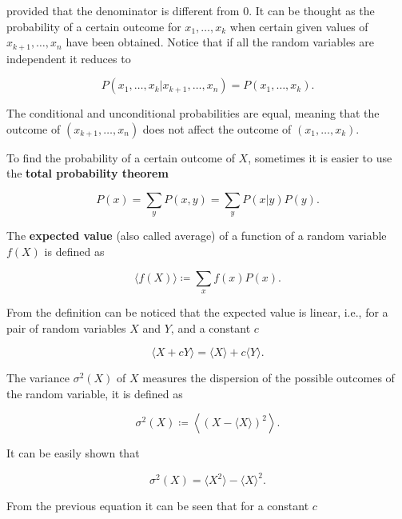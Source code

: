 provided that the denominator is different from $0$. It can be thought as the probability of a certain outcome for $x_1,\dotsc,x_k$ when certain given values of $x_{k+1},\dotsc,x_n$ have been obtained. Notice that if all the random variables are independent it reduces to

\begin{equation*}
  P(x_1,\dotsc,x_k|x_{k+1},\dotsc,x_n) = P(x_1,\dotsc,x_k).
\end{equation*}

The conditional and unconditional probabilities are equal, meaning that the outcome of $(x_{k+1},\dotsc,x_n)$ does not affect the outcome of $(x_1,\dotsc,x_k)$.

To find the probability of a certain outcome of $X$, sometimes it is easier to use the \textbf{total probability theorem}

\begin{equation*}
  P(x) = \sum_y P(x,y) = \sum_y P(x|y)P(y).
\end{equation*}

The \textbf{expected value} (also called average) of a function of a random variable $f(X)$ is defined as

\begin{equation}
  \label{eq:con-ave_def}
  \langle f(X)\rangle \coloneqq \sum_xf(x)P(x).
\end{equation}

From the definition can be noticed that the expected value is linear, i.e., for a pair of random variables $X$ and $Y$, and a constant $c$

\begin{equation*}
  \langle X+cY\rangle = \langle X\rangle+c\langle Y\rangle.
\end{equation*}

The variance $\sigma^2(X)$ of $X$ measures the dispersion of the possible outcomes of the random variable, it is defined as

\begin{equation*}
  \sigma^2(X) \coloneqq \left\langle\left( X-\langle X\rangle\right)^2\right\rangle.
\end{equation*}

It can be easily shown that

\begin{equation}
  \label{eq:con-var_nice}
  \sigma^2(X) = \langle X^2\rangle - \langle X\rangle^2.
\end{equation}

From the previous equation it can be seen that for a constant $c$

